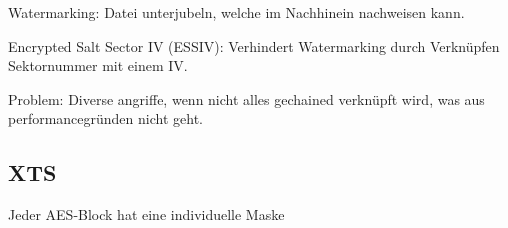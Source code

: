 Watermarking: Datei unterjubeln, welche im Nachhinein nachweisen kann.


Encrypted Salt Sector IV (ESSIV): Verhindert Watermarking durch Verknüpfen Sektornummer mit einem IV.


Problem: Diverse angriffe, wenn nicht alles gechained verknüpft wird, was aus performancegründen nicht geht.

\subsection{XTS}

Jeder AES-Block hat eine individuelle Maske 

